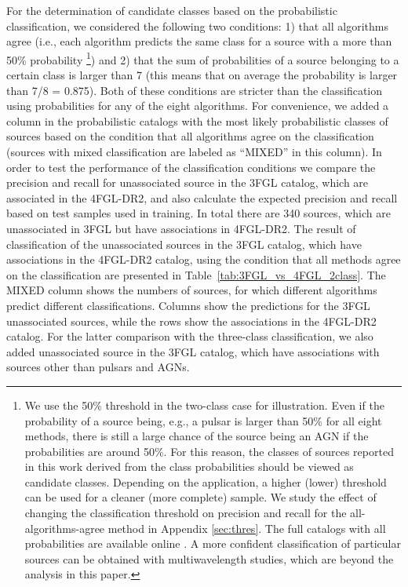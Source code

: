 \documentclass[referee]{aa} %
\begin{document}
For the determination of candidate classes based on the probabilistic classification, we considered the following two conditions:
1) that all algorithms agree (i.e., each algorithm predicts the same class for a source with a more than 50\% probability%
\footnote{We use the 50\% threshold in the two-class case for illustration. Even if the probability of a source being, e.g., a pulsar is larger than 50\% for all eight methods, there is still a large chance of the source being an AGN if the probabilities are around 50\%. 
For this reason, the classes of sources reported in this work derived from the class probabilities should be viewed as candidate classes.
Depending on the application, a higher (lower) threshold can be used for a cleaner (more complete) sample. 
We study the effect of changing the classification threshold on precision and recall for the all-algorithms-agree method in 
Appendix \ref{sec:thres}.
The full catalogs with all probabilities are available online \citep{SOM_material}.
A more confident classification of particular sources can be obtained with multiwavelength studies, 
which are beyond the analysis in this paper.}) and 
2) that the sum of probabilities of a source belonging to a certain class is larger than 7 
(this means that on average the probability is larger than 7/8 = 0.875).
Both of these conditions are stricter than the classification using probabilities for any of the eight algorithms.
For convenience, we added a column in the probabilistic catalogs with the most likely probabilistic classes of sources based on the condition that all algorithms agree on the classification (sources with mixed classification are labeled as ``MIXED'' in this column).
In order to test the performance of the classification conditions we compare the precision and recall for unassociated source in the 3FGL catalog, which are associated in the 4FGL-DR2, and also calculate the expected precision and recall based on
test samples used in training.
In total there are 340 sources, which are unassociated in 3FGL but have associations in 4FGL-DR2.
The result of classification of the unassociated sources in the 3FGL catalog, which have associations in the 4FGL-DR2 catalog, 
using the condition that all methods agree on the classification are presented in Table~\ref{tab:3FGL_vs_4FGL_2class}.
The MIXED column shows the numbers of sources, for which different algorithms predict different classifications.
Columns show the predictions for the 3FGL unassociated sources, while the rows show the associations in the 4FGL-DR2 catalog.
For the latter comparison with the three-class classification, we also added unassociated source in the 3FGL catalog, 
which have associations with sources other than pulsars and AGNs.
\end{document}
